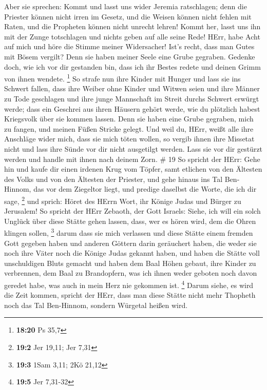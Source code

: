  Aber sie sprechen: Kommt und lasst uns wider Jeremia
ratschlagen; denn die Priester können nicht irren im Gesetz, und die
Weisen können nicht fehlen mit Raten, und die Propheten können nicht
unrecht lehren! Kommt her, lasst uns ihn mit der Zunge totschlagen und
nichts geben auf alle seine Rede!  HErr, habe Acht auf mich
und höre die Stimme meiner Widersacher!  Ist's recht, dass
man Gutes mit Bösem vergilt? Denn sie haben meiner Seele eine Grube
gegraben. Gedenke doch, wie ich vor dir gestanden bin, dass ich ihr
Bestes redete und deinen Grimm von ihnen wendete. \footnote{\textbf{18:20}
  Ps 35,7}  So strafe nun ihre Kinder mit Hunger und lass
sie ins Schwert fallen, dass ihre Weiber ohne Kinder und Witwen seien
und ihre Männer zu Tode geschlagen und ihre junge Mannschaft im Streit
durchs Schwert erwürgt werde;  dass ein Geschrei aus ihren
Häusern gehört werde, wie du plötzlich habest Kriegsvolk über sie kommen
lassen. Denn sie haben eine Grube gegraben, mich zu fangen, und meinen
Füßen Stricke gelegt.  Und weil du, HErr, weißt alle ihre
Anschläge wider mich, dass sie mich töten wollen, so vergib ihnen ihre
Missetat nicht und lass ihre Sünde vor dir nicht ausgetilgt werden. Lass
sie vor dir gestürzt werden und handle mit ihnen nach deinem Zorn. \# 19
 So spricht der HErr: Gehe hin und kaufe dir einen irdenen
Krug vom Töpfer, samt etlichen von den Ältesten des Volks und von den
Ältesten der Priester,  und gehe hinaus ins Tal Ben-Hinnom,
das vor dem Ziegeltor liegt, und predige daselbst die Worte, die ich dir
sage, \footnote{\textbf{19:2} Jer 19,11; Jer 7,31}  und
sprich: Höret des HErrn Wort, ihr Könige Judas und Bürger zu Jerusalem!
So spricht der HErr Zebaoth, der Gott Israels: Siehe, ich will ein solch
Unglück über diese Stätte gehen lassen, dass, wer es hören wird, dem die
Ohren klingen sollen, \footnote{\textbf{19:3} 1Sam 3,11; 2Kö 21,12}
 darum dass sie mich verlassen und diese Stätte einem
fremden Gott gegeben haben und anderen Göttern darin geräuchert haben,
die weder sie noch ihre Väter noch die Könige Judas gekannt haben, und
haben die Stätte voll unschuldigen Bluts gemacht  und haben
dem Baal Höhen gebaut, ihre Kinder zu verbrennen, dem Baal zu
Brandopfern, was ich ihnen weder geboten noch davon geredet habe, was
auch in mein Herz nie gekommen ist. \footnote{\textbf{19:5} Jer 7,31-32}
 Darum siehe, es wird die Zeit kommen, spricht der HErr,
dass man diese Stätte nicht mehr Thopheth noch das Tal Ben-Hinnom,
sondern Würgetal heißen wird.

